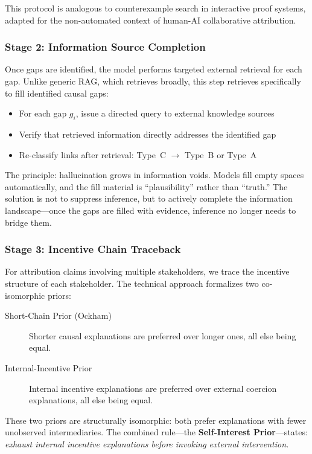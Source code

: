 This protocol is analogous to counterexample search in interactive proof 
systems, adapted for the non-automated context of human-AI collaborative 
attribution.

\subsubsection{Stage 2: Information Source Completion}

Once gaps are identified, the model performs targeted external retrieval for 
each gap. Unlike generic RAG, which retrieves broadly, this step retrieves 
specifically to fill identified causal gaps:

\begin{itemize}
  \item For each gap $g_i$, issue a directed query to external knowledge sources
  \item Verify that retrieved information directly addresses the identified gap
  \item Re-classify links after retrieval: Type~C $\rightarrow$ Type~B or Type~A
\end{itemize}

The principle: hallucination grows in information voids. Models fill 
empty spaces automatically, and the fill material is ``plausibility'' rather 
than ``truth.'' The solution is not to suppress inference, but to actively 
complete the information landscape---once the gaps are filled with evidence, 
inference no longer needs to bridge them.

\subsubsection{Stage 3: Incentive Chain Traceback}

For attribution claims involving multiple stakeholders, we trace the incentive 
structure of each stakeholder. The technical approach formalizes two 
co-isomorphic priors:

\begin{description}
  \item[Short-Chain Prior (Ockham)] Shorter causal explanations are preferred 
        over longer ones, all else being equal.
  \item[Internal-Incentive Prior] Internal incentive explanations are preferred 
        over external coercion explanations, all else being equal.
\end{description}

These two priors are structurally isomorphic: both prefer explanations with 
fewer unobserved intermediaries. The combined rule---the \textbf{Self-Interest 
Prior}---states: \textit{exhaust internal incentive explanations before 
invoking external intervention.}

